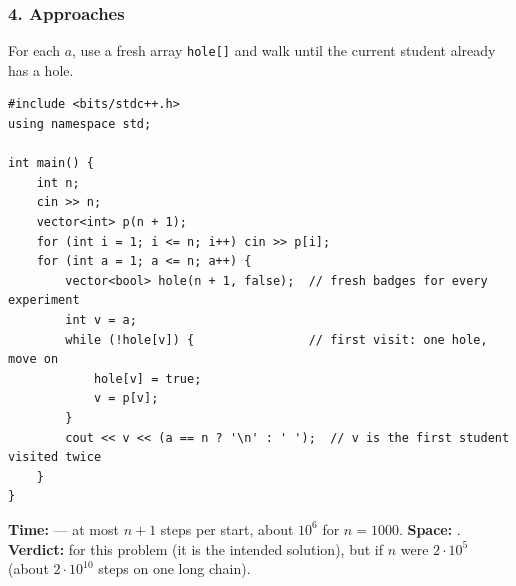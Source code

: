 \subsubsection*{4. Approaches}

\begin{bruteforcebox}
For each $a$, use a fresh array \texttt{hole[]} and walk until the current student already has a hole.

\begin{lstlisting}[style=cpp]
#include <bits/stdc++.h>
using namespace std;

int main() {
    int n;
    cin >> n;
    vector<int> p(n + 1);
    for (int i = 1; i <= n; i++) cin >> p[i];
    for (int a = 1; a <= n; a++) {
        vector<bool> hole(n + 1, false);  // fresh badges for every experiment
        int v = a;
        while (!hole[v]) {                // first visit: one hole, move on
            hole[v] = true;
            v = p[v];
        }
        cout << v << (a == n ? '\n' : ' ');  // v is the first student visited twice
    }
}
\end{lstlisting}

\begin{complexitybox}
\textbf{Time:}  --- at most $n+1$ steps per start, about $10^6$ for $n = 1000$. \textbf{Space:} . \textbf{Verdict:} \ac{} for this problem (it is the intended solution), but \tle{} if $n$ were $2\cdot10^5$ (about $2\cdot10^{10}$ steps on one long chain).
\end{complexitybox}
\end{bruteforcebox}

